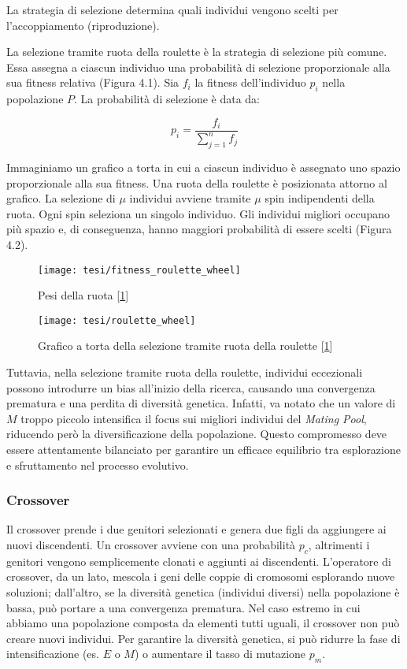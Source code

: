 La strategia di selezione determina quali individui vengono scelti per l'accoppiamento (riproduzione).

La selezione tramite ruota della roulette è la strategia di selezione più comune. Essa assegna a ciascun individuo una probabilità di selezione proporzionale alla sua fitness relativa (Figura 4.1). Sia $f_i$ la fitness dell'individuo $p_i$ nella popolazione $P$. La probabilità di selezione è data da:

\[ p_i = \frac{f_i}{\sum_{j=1}^{n} f_j} \]

Immaginiamo un grafico a torta in cui a ciascun individuo è assegnato uno spazio proporzionale alla sua fitness. Una ruota della roulette è posizionata attorno al grafico. La selezione di $\mu$ individui avviene tramite $\mu$ spin indipendenti della ruota. Ogni spin seleziona un singolo individuo. Gli individui migliori occupano più spazio e, di conseguenza, hanno maggiori probabilità di essere scelti (Figura 4.2).
\hypertarget{img6}{}
\begin{figure}[!ht] 
    \centering 
    \texttt{[image: tesi/fitness\_roulette\_wheel]} 
    \caption[Pesi della ruota]{Pesi della ruota [\hyperlink{bibliografia}{1}]}
\end{figure}

\hypertarget{img7}{}
\begin{figure}[!ht] 
    \centering 
    \texttt{[image: tesi/roulette\_wheel]} 
    \caption[Grafico a torta della selezione tramite ruota della roulette]{Grafico a torta della selezione tramite ruota della roulette [\hyperlink{bibliografia}{1}]}
\end{figure}

Tuttavia, nella selezione tramite ruota della roulette, individui eccezionali possono introdurre un bias all'inizio della ricerca, causando una convergenza prematura e una perdita di diversità genetica. Infatti, va notato che un valore di \( M \) troppo piccolo intensifica il focus sui migliori individui del \emph{Mating Pool}, riducendo però la diversificazione della popolazione. Questo compromesso deve essere attentamente bilanciato per garantire un efficace equilibrio tra esplorazione e sfruttamento nel processo evolutivo.

\subsubsection{Crossover}
Il crossover prende i due genitori selezionati e genera due figli da aggiungere ai nuovi discendenti. Un crossover avviene con una probabilità $p_c$, altrimenti i genitori vengono semplicemente clonati e aggiunti ai discendenti. L'operatore di crossover, da un lato, mescola i geni delle coppie di cromosomi esplorando nuove soluzioni; dall'altro, se la diversità genetica (individui diversi) nella popolazione è bassa, può portare a una convergenza prematura. Nel caso estremo in cui abbiamo una popolazione composta da elementi tutti uguali, il crossover non può creare nuovi individui. Per garantire la diversità genetica, si può ridurre la fase di intensificazione (es. $E$ o $M$) o aumentare il tasso di mutazione $p_m$.

